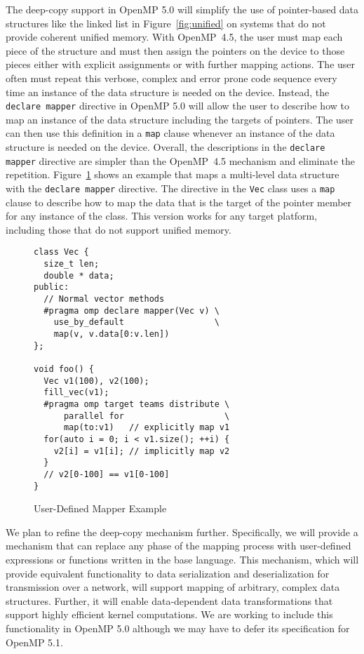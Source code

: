 The deep-copy support in OpenMP 5.0 will simplify the use of pointer-based 
data structures like the linked list in Figure~\ref{fig:unified} on systems 
that do not provide coherent unified memory. With OpenMP~4.5, the user must 
map each piece of the structure and must then assign the pointers on the 
device to those pieces either with explicit assignments or with further 
mapping actions. The user often must repeat this verbose, complex and error 
prone code sequence every time an instance of the data structure is needed 
on the device. Instead, the \texttt{declare mapper} directive in OpenMP 5.0 
will allow the user to describe how to map an instance of the data structure 
including the targets of pointers. The user can then use this definition in 
a \texttt{map} clause whenever an instance of the data structure is needed 
on the device. Overall, the descriptions in the \texttt{declare mapper} 
directive are simpler than the OpenMP~4.5 mechanism and eliminate the 
repetition. Figure~\ref{fig:mapper} shows an example that maps a multi-level 
data structure with the \texttt{declare mapper} directive.  The directive in 
the \texttt{Vec} class uses a \texttt{map} clause to describe how to map the 
data that is the target of the pointer member for any instance of the class.  
This version works for any target platform, including those that do not 
support unified memory.

\begin{figure}
\begin{verbatim}
class Vec {
  size_t len;
  double * data;
public:
  // Normal vector methods
  #pragma omp declare mapper(Vec v) \
    use_by_default                  \
    map(v, v.data[0:v.len])
};

void foo() {
  Vec v1(100), v2(100);
  fill_vec(v1);
  #pragma omp target teams distribute \
      parallel for                    \
      map(to:v1)   // explicitly map v1
  for(auto i = 0; i < v1.size(); ++i) { 
    v2[i] = v1[i]; // implicitly map v2
  }
  // v2[0-100] == v1[0-100]
}
\end{verbatim}
\caption{User-Defined Mapper Example\label{fig:mapper}}
\end{figure}

We plan to refine the deep-copy mechanism further. Specifically, we will 
provide a mechanism that can replace any phase of the mapping process with 
user-defined expressions or functions written in the base language. This 
mechanism, which will provide equivalent functionality to data  serialization 
and deserialization for transmission over a network,  will support mapping 
of arbitrary, complex data structures. Further, it will enable data-dependent 
data transformations that support highly efficient kernel computations. We
are working to include this functionality in OpenMP 5.0 although we may
have to defer its specification for OpenMP 5.1.




